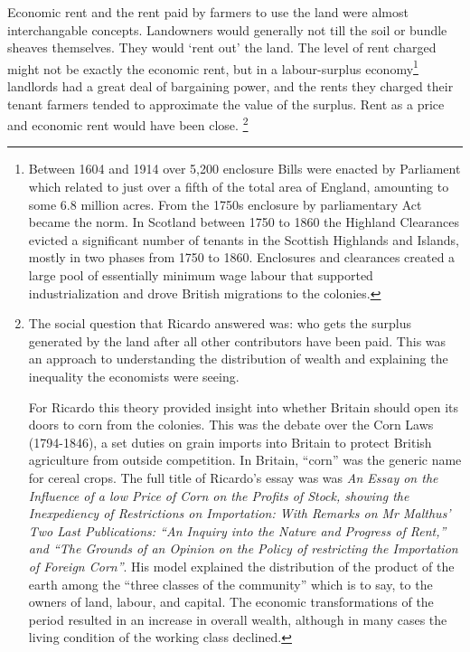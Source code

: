  Economic rent and the rent paid by farmers to use the land were almost interchangable concepts. Landowners would generally not %
 till the soil or bundle sheaves themselves. They would `rent out' the land. The level of rent charged might not be exactly the economic rent, but in a labour-surplus economy\footnote{Between 1604 and 1914 over 5,200 enclosure Bills were enacted by Parliament which related to just over a fifth of the total area of England, amounting to some 6.8 million acres. From the 1750s enclosure by parliamentary Act became the norm. In Scotland  between 1750 to 1860 the  Highland Clearances  evicted a significant number of tenants in the Scottish Highlands and Islands, mostly in two phases from 1750 to 1860. Enclosures and clearances created a large pool of essentially minimum wage labour that supported industrialization and drove British migrations to the colonies.} landlords had a great deal of bargaining power, and the rents they charged their tenant farmers tended to approximate the value of the surplus. Rent as a price and economic rent would have been close.%
 \footnote{The social question that Ricardo answered was: who gets the surplus generated by the land after all other contributors have been paid. This was an approach to understanding the distribution of wealth and explaining the inequality the economists were seeing. 
 
For Ricardo this theory provided insight into whether Britain should open its doors to corn from the colonies. This was the debate over the Corn Laws (1794-1846), a set duties on grain imports into Britain to protect British agriculture from outside competition. In Britain, ``corn'' was the generic name for cereal crops. The full title of Ricardo's essay was was \textit{An Essay on the Influence of a low Price of Corn on the Profits of Stock, showing the Inexpediency of Restrictions on Importation: With Remarks on Mr Malthus' Two Last Publications: ``An Inquiry into the Nature and Progress of Rent,'' and ``The Grounds of an Opinion on the Policy of restricting the Importation of Foreign Corn''}.
His model  explained the distribution of the product of the earth among the “three classes of the community” which is to say, to the owners of land, labour, and capital.   %
The economic transformations of the period resulted in an increase in overall wealth, although in many cases the living condition of the working class declined.} %

